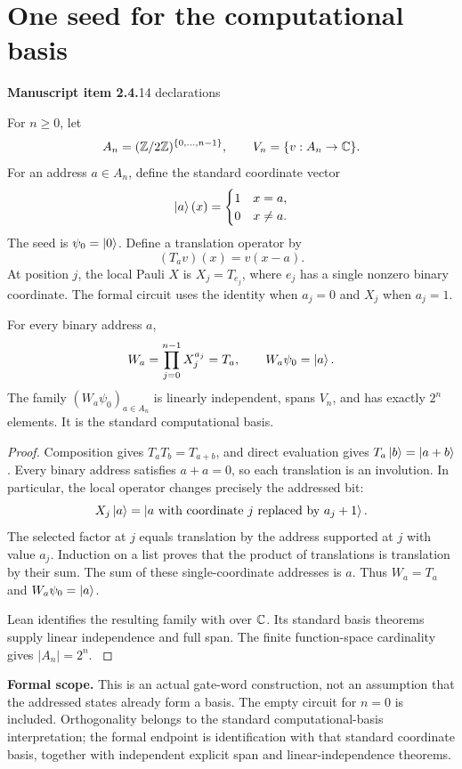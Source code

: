 \section{One seed for the computational basis}\label{supp2:section:001}
\textbf{Manuscript item 2.4.}\quad {}\hfill 14 declarations

For $n\geq 0$, let
\[
 A_n=(\mathbb Z/2\mathbb Z)^{\{0,\ldots,n-1\}},\qquad
 V_n=\{v:A_n\to\mathbb C\}.
\]
For an address $a\in A_n$, define the standard coordinate vector
\[
 \left|a\right\rangle(x)=\begin{cases}1&x=a,\\0&x\ne a.\end{cases}
\]
The seed is $\psi_0=\left|0\right\rangle$. Define a translation operator by
\[
 (T_a v)(x)=v(x-a).
\]
At position $j$, the local Pauli $X$ is $X_j=T_{e_j}$, where $e_j$ has a single nonzero binary coordinate. The formal circuit uses the identity when $a_j=0$ and $X_j$ when $a_j=1$.

\begin{statement}\label{supp2:statement:001}
For every binary address $a$,
\[
 W_a=\prod_{j=0}^{n-1}X_j^{a_j}=T_a,
 \qquad W_a\psi_0=\left|a\right\rangle.
\]
The family $(W_a\psi_0)_{a\in A_n}$ is linearly independent, spans $V_n$, and has exactly $2^n$ elements. It is the standard computational basis.
\end{statement}

\begin{proof}\label{supp2:proof:001}
Composition gives $T_aT_b=T_{a+b}$, and direct evaluation gives $T_a\left|b\right\rangle=\left|a+b\right\rangle$. Every binary address satisfies $a+a=0$, so each translation is an involution. In particular, the local operator changes precisely the addressed bit:
\[
 X_j\left|a\right\rangle=\left|a\text{ with coordinate }j\text{ replaced by }a_j+1\right\rangle.
\]
The selected factor at $j$ equals translation by the address supported at $j$ with value $a_j$. Induction on a list proves that the product of translations is translation by their sum. The sum of these single-coordinate addresses is $a$. Thus $W_a=T_a$ and $W_a\psi_0=\left|a\right\rangle$.

Lean identifies the resulting family with  over $\mathbb C$. Its standard basis theorems supply linear independence and full span. The finite function-space cardinality gives $|A_n|=2^n$.
\label{supp2:proof:001:end}\end{proof}

\textbf{Formal scope.} This is an actual gate-word construction, not an assumption that the addressed states already form a basis. The empty circuit for $n=0$ is included. Orthogonality belongs to the standard computational-basis interpretation; the formal endpoint is identification with that standard coordinate basis, together with independent explicit span and linear-independence theorems.





